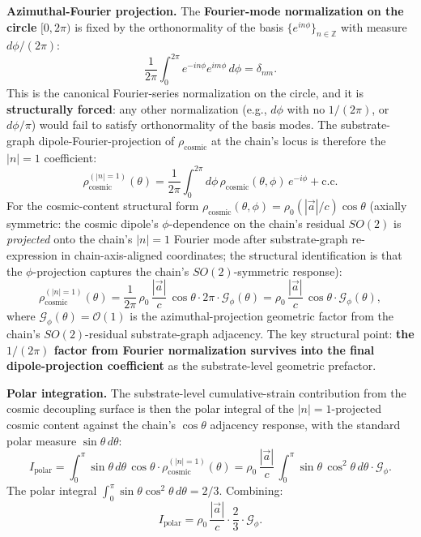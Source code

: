 \documentclass[11pt,a4paper]{article}
\begin{document}
\textbf{Azimuthal-Fourier projection.} The \textbf{Fourier-mode normalization on the circle} $[0, 2\pi)$ is fixed by the orthonormality of the basis $\{e^{in\phi}\}_{n \in \mathbb{Z}}$ with measure $d\phi/(2\pi)$:
\[
\frac{1}{2\pi}\int_0^{2\pi}e^{-in\phi}e^{im\phi}\,d\phi = \delta_{nm}.
\]
This is the canonical Fourier-series normalization on the circle, and it is \textbf{structurally forced}: any other normalization (e.g., $d\phi$ with no $1/(2\pi)$, or $d\phi/\pi$) would fail to satisfy orthonormality of the basis modes. The substrate-graph dipole-Fourier-projection of $\rho_\mathrm{cosmic}$ at the chain's locus is therefore the $|n|=1$ coefficient:
\[
\rho^{(|n|=1)}_\mathrm{cosmic}(\theta) = \frac{1}{2\pi}\int_0^{2\pi}d\phi\,\rho_\mathrm{cosmic}(\theta,\phi)\,e^{-i\phi} + \text{c.c.}
\]
For the cosmic-content structural form $\rho_\mathrm{cosmic}(\theta,\phi) = \rho_0(|\vec{a}|/c)\cos\theta$ (axially symmetric: the cosmic dipole's $\phi$-dependence on the chain's residual $SO(2)$ is \emph{projected} onto the chain's $|n|=1$ Fourier mode after substrate-graph re-expression in chain-axis-aligned coordinates; the structural identification is that the $\phi$-projection captures the chain's $SO(2)$-symmetric response):
\[
\rho^{(|n|=1)}_\mathrm{cosmic}(\theta) = \frac{1}{2\pi}\,\rho_0\,\frac{|\vec{a}|}{c}\,\cos\theta \cdot 2\pi \cdot \mathcal{G}_\phi(\theta) = \rho_0\,\frac{|\vec{a}|}{c}\,\cos\theta \cdot \mathcal{G}_\phi(\theta),
\]
where $\mathcal{G}_\phi(\theta) = \mathcal{O}(1)$ is the azimuthal-projection geometric factor from the chain's $SO(2)$-residual substrate-graph adjacency. The key structural point: \textbf{the $1/(2\pi)$ factor from Fourier normalization survives into the final dipole-projection coefficient} as the substrate-level geometric prefactor.

\textbf{Polar integration.} The substrate-level cumulative-strain contribution from the cosmic decoupling surface is then the polar integral of the $|n|=1$-projected cosmic content against the chain's $\cos\theta$ adjacency response, with the standard polar measure $\sin\theta\,d\theta$:
\[
I_\mathrm{polar} = \int_0^\pi \sin\theta\,d\theta\,\cos\theta \cdot \rho^{(|n|=1)}_\mathrm{cosmic}(\theta) = \rho_0\,\frac{|\vec{a}|}{c}\,\int_0^\pi \sin\theta\,\cos^2\theta\,d\theta \cdot \mathcal{G}_\phi.
\]
The polar integral $\int_0^\pi \sin\theta \cos^2\theta\,d\theta = 2/3$. Combining:
\[
I_\mathrm{polar} = \rho_0\,\frac{|\vec{a}|}{c}\cdot \frac{2}{3}\cdot \mathcal{G}_\phi.
\]
\end{document}
